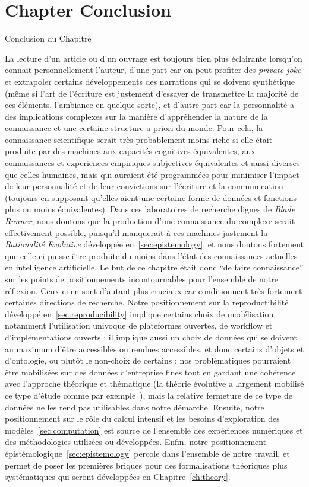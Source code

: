 


\newpage


\section*{Chapter Conclusion}{Conclusion du Chapitre}


La lecture d'un article ou d'un ouvrage est toujours bien plus éclairante lorsqu'on connait personnellement l'auteur, d'une part car on peut profiter des \emph{private joke} et extrapoler certains développements des narrations qui se doivent synthétique (même si l'art de l'écriture est justement d'essayer de transmettre la majorité de ces éléments, l'ambiance en quelque sorte), et d'autre part car la personnalité a des implications complexes sur la manière d'appréhender la nature de la connaissance et une certaine structure a priori du monde. Pour cela, la connaissance scientifique serait très probablement moins riche si elle était produite par des machines aux capacités cognitives équivalentes, aux connaissances et experiences empiriques subjectives équivalentes et aussi diverses que celles humaines, mais qui auraient été programmées pour minimiser l'impact de leur personnalité et de leur convictions sur l'écriture et la communication (toujours en supposant qu'elles aient une certaine forme de données et fonctions plus ou moins équivalentes). Dans ces laboratoires de recherche dignes de \emph{Blade Runner}, nous doutons que la production d'une connaissance du complexe serait effectivement possible, puisqu'il manquerait à ces machines justement la \emph{Rationalité Evolutive} développée en~\ref{sec:epistemology}, et nous doutons fortement que celle-ci puisse être produite du moins dans l'état des connaissances actuelles en intelligence artificielle. Le but de ce chapitre était donc ``de faire connaissance'' sur les points de positionnements incontournables pour l'ensemble de notre réflexion. Ceux-ci en sont d'autant plus cruciaux car conditionnent très fortement certaines directions de recherche. Notre positionnement sur la reproductibilité développé en~\ref{sec:reproducibility} implique certains choix de modélisation, notamment l'utilisation univoque de plateformes ouvertes, de workflow et d'implémentations ouverts ; il implique aussi un choix de données qui se doivent au maximum d'être accessibles ou rendues accessibles, et donc certains d'objets et d'ontologie, ou plutôt le non-choix de certains : nos problématiques pourraient être mobilisées sur des données d'entreprise fines tout en gardant une cohérence avec l'approche théorique et thématique (la théorie évolutive a largement mobilisé ce type d'étude comme par exemple~\cite{paulus2004coevolution}), mais la relative fermeture de ce type de données ne les rend pas utilisables dans notre démarche. Ensuite, notre positionnement sur le rôle du calcul intensif et les besoins d'exploration des modèles~\ref{sec:computation} est source de l'ensemble des expériences numériques et des méthodologies utilisées ou développées. Enfin, notre positionnement épistémologique~\ref{sec:epistemology} percole dans l'ensemble de notre travail, et permet de poser les premières briques pour des formalisations théoriques plus systématiques qui seront développées en Chapitre~\ref{ch:theory}.


